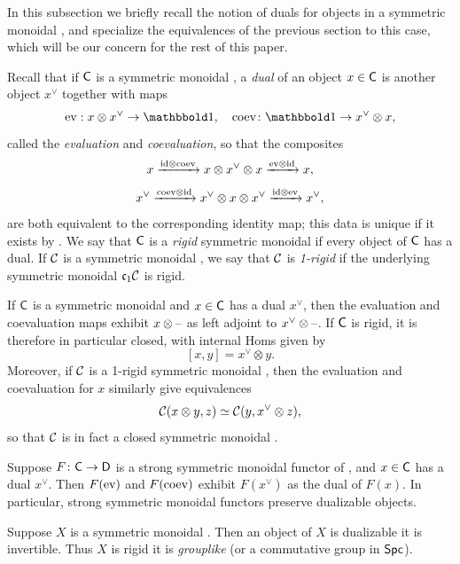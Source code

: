 \documentclass[a4paper,11pt]{article}
\begin{document}
In this subsection we briefly recall the notion of duals for objects
in a symmetric monoidal \incat{}, and specialize the equivalences of
the previous section to this case, which will be our concern for
the rest of this paper.

\begin{defn}
  Recall that if $\textup{\textsf{C}}$ is a symmetric monoidal \icat{}, a \emph{dual}
  of an object $x \in \textup{\textsf{C}}$ is another object $x^{\vee}$ together with
  maps
  \[ \ev : x \otimes x^{\vee} \to \bbone, \quad \coev \colon \bbone
    \to x^{\vee} \otimes x,\] called the \emph{evaluation} and
  \emph{coevaluation}, so that the composites
  \[ x \xto{\id \otimes \coev} x \otimes x^{\vee} \otimes x \xto{\ev
      \otimes \id} x,\]
  \[ x^{\vee} \xto{\coev \otimes \id} x^{\vee} \otimes x \otimes
    x^{\vee} \xto{\id \otimes \ev} x^{\vee},\] are both equivalent to
  the corresponding identity map; this data is unique if it exists by
  \cite[Lemma 4.6.1.10]{HA}. We say that $\textup{\textsf{C}}$ is a \emph{rigid}
  symmetric monoidal \icat{} if every object of $\textup{\textsf{C}}$ has a dual. If
  $\mathcal{C}$ is a symmetric monoidal \incat{}, we say that $\mathcal{C}$ is
  \emph{1-rigid} if the underlying symmetric monoidal \icat{}
  $\mathfrak{c}_{1} \mathcal{C}$ is rigid.
\end{defn}

\begin{observation}
  If $\textup{\textsf{C}}$ is a symmetric monoidal \icat{} and $x \in \textup{\textsf{C}}$ has a dual
  $x^{\vee}$, then the evaluation and coevaluation maps exhibit $x
  \otimes \text{\textendash}$ as left adjoint to $x^{\vee} \otimes
  \text{\textendash}$. If $\textup{\textsf{C}}$ is rigid, it is therefore in particular closed,
  with internal Homs given by
  \[ [x,y] = x^{\vee} \otimes y.\]
  Moreover, if $\mathcal{C}$ is a 1-rigid symmetric monoidal \incat{}, then
  the evaluation and coevaluation for $x$ similarly give equivalences
  \[ \mathcal{C}(x \otimes y, z) \simeq \mathcal{C}(y, x^{\vee} \otimes z),\]
  so that $\mathcal{C}$ is in fact a closed symmetric monoidal \incat{}.
\end{observation}

\begin{observation}
  Suppose $F \colon \oC \to \oD$ is a strong symmetric monoidal
  functor of \icats{}, and $x \in \textup{\textsf{C}}$ has a dual $x^{\vee}$. Then
  $F(\text{\textup{ev}})$ and $F(\text{\textup{coev}})$ exhibit $F(x^{\vee})$ as the dual of
  $F(x)$. In particular, strong symmetric monoidal functors preserve
  dualizable objects.
\end{observation}

\begin{observation}\label{obs:rigid gpd}
  Suppose $X$ is a symmetric monoidal \igpd{}. Then an object of $X$
  is dualizable \IFF{} it is invertible. Thus $X$ is rigid \IFF{} it
  is \emph{grouplike} (or a commutative group in $\textup{\textsf{Spc}}$).
\end{observation}
\end{document}
